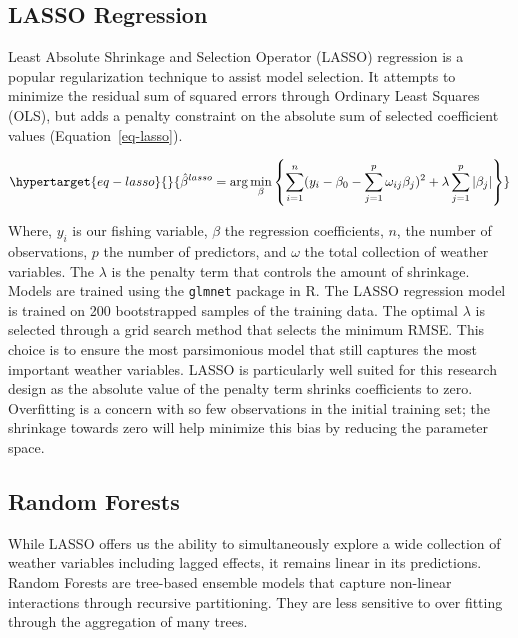 \documentclass[
  letterpaper,
  DIV=11,
  numbers=noendperiod]{scrartcl}
\begin{document}
\hypertarget{lasso-regression}{%
\subsection{LASSO Regression}\label{lasso-regression}}

Least Absolute Shrinkage and Selection Operator (LASSO) regression is a
popular regularization technique to assist model selection. It attempts
to minimize the residual sum of squared errors through Ordinary Least
Squares (OLS), but adds a penalty constraint on the absolute sum of
selected coefficient values (Equation~\ref{eq-lasso}).

\begin{equation}\protect\hypertarget{eq-lasso}{}{
\hat{\beta}^{lasso}=\arg\min_{\beta}\left\{\sum_{i=1}^{n}(y_i-\beta_0-\sum_{j=1}^{p}\omega_{ij}\beta_j)^2+\lambda\sum_{j=1}^{p}|\beta_j|\right\}
}\label{eq-lasso}\end{equation}

Where, \(y_i\) is our fishing variable, \(\beta\) the regression
coefficients, \(n\), the number of observations, \(p\) the number of
predictors, and \(\omega\) the total collection of weather variables.
The \(\lambda\) is the penalty term that controls the amount of
shrinkage. Models are trained using the \texttt{glmnet} package in R.
The LASSO regression model is trained on 200 bootstrapped samples of the
training data. The optimal \(\lambda\) is selected through a grid search
method that selects the minimum RMSE. This choice is to ensure the most
parsimonious model that still captures the most important weather
variables. LASSO is particularly well suited for this research design as
the absolute value of the penalty term shrinks coefficients to zero.
Overfitting is a concern with so few observations in the initial
training set; the shrinkage towards zero will help minimize this bias by
reducing the parameter space.

\hypertarget{random-forests}{%
\subsection{Random Forests}\label{random-forests}}

While LASSO offers us the ability to simultaneously explore a wide
collection of weather variables including lagged effects, it remains
linear in its predictions. Random Forests are tree-based ensemble models
that capture non-linear interactions through recursive partitioning.
They are less sensitive to over fitting through the aggregation of many
trees.
\end{document}

